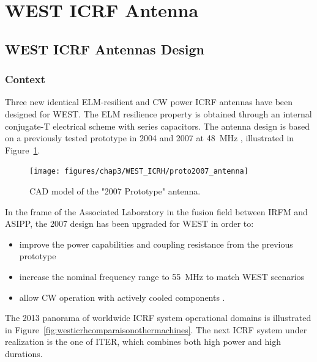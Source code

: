 \section{WEST ICRF Antenna}\label{eq:WEST_ICRF_work}


\subsection{WEST ICRF Antennas Design}\label{eq:WEST_ICRH_antenna}

\subsubsection{Context}
Three new identical ELM-resilient and CW power ICRF antennas have been designed for WEST. The ELM resilience property is obtained through an internal conjugate-T electrical scheme with series capacitors. The antenna design is based on a previously tested prototype in 2004 and 2007 at 48~MHz , illustrated in Figure~\ref{fig:proto2007antenna}. 

\begin{figure}[h]
	\centering
	\texttt{[image: figures/chap3/WEST\_ICRH/proto2007\_antenna]}
	\caption{CAD model of the "2007 Prototype" antenna.}
	\label{fig:proto2007antenna}
\end{figure}

In the frame of the Associated Laboratory in the fusion field between IRFM and ASIPP, the 2007 design has been upgraded for WEST in order to: 
\begin{itemize}
	\item improve the power capabilities and coupling resistance from the previous prototype 
	\item increase the nominal frequency range to 55~MHz to match WEST scenarios 
	\item allow CW operation with actively cooled components .
\end{itemize} 

The 2013 panorama of worldwide ICRF system operational domains is illustrated in Figure~\ref{fig:westicrhcomparaisonothermachines}. The next ICRF system under realization is the one of ITER, which combines both high power and high durations. 

